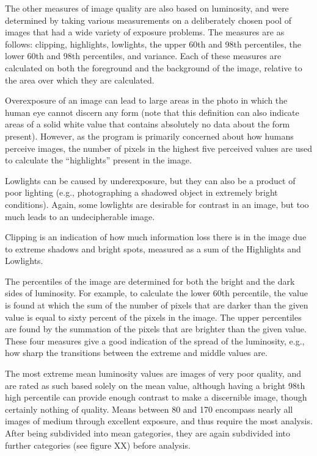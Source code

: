 \documentclass[twocolumn]{article}
\begin{document}
The other measures of image quality are also based on luminosity, and were determined by taking various measurements on a deliberately chosen pool of images that had a wide variety of exposure problems. The measures are as follows: clipping, highlights, lowlights, the upper 60th and 98th percentiles, the lower 60th and 98th percentiles, and variance. Each of these measures are calculated on both the foreground and the background of the image, relative to the area over which they are calculated.

Overexposure of an image can lead to large areas in the photo in which the human eye cannot discern any form (note that this definition can also indicate areas of a solid white value that contains absolutely no data about the form present). However, as the program is primarily concerned about how humans perceive images, the number of pixels in the highest five perceived values are used to calculate the “highlights” present in the image.

Lowlights can be caused by underexposure, but they can also be a product of poor lighting (e.g., photographing a shadowed object in extremely bright conditions). Again, some lowlights are desirable for contrast in an image, but too much leads to an undecipherable image.

Clipping is an indication of how much information loss there is in the image due to extreme shadows and bright spots, measured as a sum of the Highlights and Lowlights.

The percentiles of the image are determined for both the bright and the dark sides of luminosity. For example, to calculate the lower 60th percentile, the value is found at which the sum of the number of pixels that are darker than the given value is equal to sixty percent of the pixels in the image. The upper percentiles are found by the summation of the pixels that are brighter than the given value. These four measures give a good indication of the spread of the luminosity, e.g., how sharp the transitions between the extreme and middle values are.

The most extreme mean luminosity values are images of very poor quality, and are rated as such based solely on the mean value, although having a bright 98th high percentile can provide enough contrast to make a discernible image, though certainly nothing of quality. Means between 80 and 170 encompass nearly all images of medium through excellent exposure, and thus require the most analysis. After being subdivided into mean gategories, they are again subdivided into further categories (see figure XX) before analysis.
\end{document}
